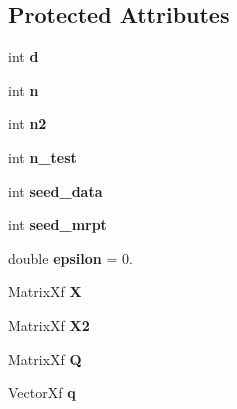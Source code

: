 \subsection*{Protected Attributes}
\begin{DoxyCompactItemize}
\item 
\mbox{\label{class_mrpt_test_a8d0a86d51be20dc97328d01ae3063f4d}} 
int {\bfseries d}
\item 
\mbox{\label{class_mrpt_test_ab1668136de88087a8ae2a5c1082dec5d}} 
int {\bfseries n}
\item 
\mbox{\label{class_mrpt_test_a1c2e9b308d5e90fe1725e392efbeca13}} 
int {\bfseries n2}
\item 
\mbox{\label{class_mrpt_test_a6a22d44b33026bca9a3ff546bdd17dfb}} 
int {\bfseries n\+\_\+test}
\item 
\mbox{\label{class_mrpt_test_ab1c4fae453c57ae3c53f46502750fabe}} 
int {\bfseries seed\+\_\+data}
\item 
\mbox{\label{class_mrpt_test_adc2cf40774fb479b1d1cbc9b453b329b}} 
int {\bfseries seed\+\_\+mrpt}
\item 
\mbox{\label{class_mrpt_test_a645e29f102abc83e083fc8784547c434}} 
double {\bfseries epsilon} = 0.
\item 
\mbox{\label{class_mrpt_test_a4db9dc6194b03b07f828eddbee4802e9}} 
Matrix\+Xf {\bfseries X}
\item 
\mbox{\label{class_mrpt_test_a4dc5308db9f91b5ccef42c4ec29a6a44}} 
Matrix\+Xf {\bfseries X2}
\item 
\mbox{\label{class_mrpt_test_a486327c97fd0190be0d4ccb17be995de}} 
Matrix\+Xf {\bfseries Q}
\item 
\mbox{\label{class_mrpt_test_a63ad020a987a1de41bb1e6b435ec093e}} 
Vector\+Xf {\bfseries q}
\item 
\mbox{\label{class_mrpt_test_a21c057ee87babe0d71188e2c8abe549d}} 

\end{DoxyCompactItemize}
